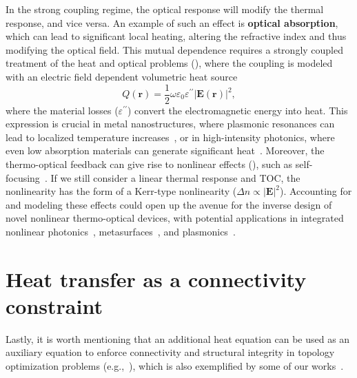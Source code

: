 In the strong coupling regime, the optical response will modify the thermal response, and vice versa.
An example of such an effect is \textbf{optical absorption}, which can lead to significant local heating, altering the refractive index and thus modifying the optical field. 
This mutual dependence requires a strongly coupled treatment of the heat and optical problems (), where the coupling is modeled with an electric field dependent volumetric heat source~\cite{plasm_heat_source}
\[
Q(\mathbf{r}) = \frac{1}{2} \omega \varepsilon_0 \varepsilon^{\prime \prime} |\mathbf{E}(\mathbf{r})|^2,
\]
where the material losses ($\varepsilon^{\prime \prime}$) convert the electromagnetic energy into heat. 
This expression is crucial in metal nanostructures, where plasmonic resonances can lead to localized temperature increases~\cite{plasm_heat_source}, or in 
high-intensity photonics, where even low absorption materials can generate significant heat~\cite{thermal_nl, high_I_T}. Moreover, the thermo-optical feedback can give rise to nonlinear effects (), such as self-focusing~\cite{thermal_nl}. If we still consider a linear
thermal response and TOC,
the nonlinearity has the form of a Kerr-type nonlinearity ($\Delta n \propto \vert \mathbf{E} \vert^2$). Accounting for and modeling
these effects could open up the avenue for the inverse design of novel nonlinear thermo-optical devices, with potential applications
in integrated nonlinear photonics~\cite{nl_photonics}, metasurfaces~\cite{nl_meta}, and plasmonics~\cite{novotny}.

\section{Heat transfer as a connectivity constraint}\label{sec:aux}

Lastly, it is worth mentioning that an additional heat equation can be used as an auxiliary equation to enforce connectivity
and structural integrity in topology optimization problems (e.g.,~\cite{vanessa, structural_heat}), which is also exemplified by some of our
works~\cite{ownpub1,ownpub2}. 

